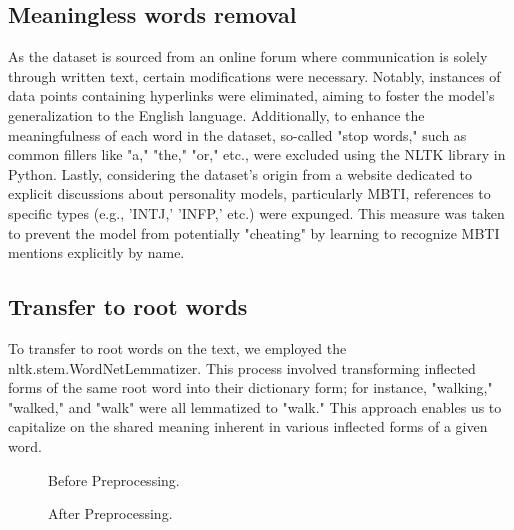 \documentclass{article}
\begin{document}
\subsection{Meaningless words removal}
As the dataset is sourced from an online forum where communication is solely through written text, certain modifications were necessary. Notably, instances of data points containing hyperlinks were eliminated, aiming to foster the model's generalization to the English language. Additionally, to enhance the meaningfulness of each word in the dataset, so-called "stop words," such as common fillers like "a," "the," "or," etc., were excluded using the NLTK library in Python. Lastly, considering the dataset's origin from a website dedicated to explicit discussions about personality models, particularly MBTI, references to specific types (e.g., 'INTJ,' 'INFP,' etc.) were expunged. This measure was taken to prevent the model from potentially "cheating" by learning to recognize MBTI mentions explicitly by name.
\subsection{Transfer to root words}
To transfer to root words on the text, 
we employed the nltk.stem.WordNetLemmatizer. 
This process involved transforming inflected forms of the same root word into their dictionary form; for instance, "walking," "walked," and "walk" were all lemmatized to "walk." This approach enables us to capitalize on the shared meaning inherent in various inflected forms of a given word.
\begin{figure}
  \centering
  \caption{ Before Preprocessing.}
\end{figure}
\begin{figure}
  \centering
  \caption{ After Preprocessing.}
\end{figure}
\end{document}
